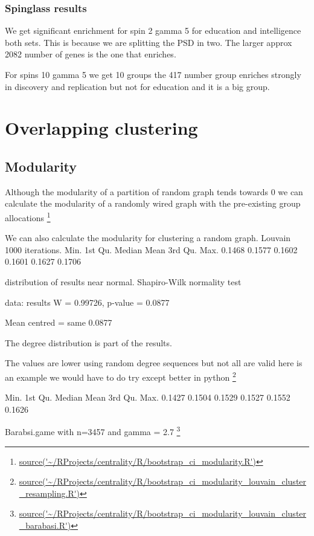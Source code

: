 \subsubsection{Spinglass results}
We get significant enrichment for spin 2 gamma 5 for education and intelligence both sets. This is because we are splitting the PSD in two. The larger approx 2082 number of genes is the one that enriches.

For spins 10 gamma 5 we get 10 groups the 417 number group enriches strongly in discovery and replication but not for education and it is a big group.


\section{Overlapping clustering}

\subsection{Modularity}

Although the modularity of a partition of random graph tends towards 0 we can calculate the modularity of a randomly wired graph with the pre-existing group allocations \footnote{\url{source('~/RProjects/centrality/R/bootstrap_ci_modularity.R')}}

We can also calculate the modularity for clustering a random graph. Louvain 1000 iterations.
  Min. 1st Qu.  Median    Mean 3rd Qu.    Max. 
 0.1468  0.1577  0.1602  0.1601  0.1627  0.1706 
 
 distribution of results near normal. 	Shapiro-Wilk normality test

data:  results
W = 0.99726, p-value = 0.0877

Mean centred = same 0.0877

The degree distribution is part of the results. 

The values are lower using random degree sequences but not all are valid here is an example we would have to do try except better in python \footnote{\url{source('~/RProjects/centrality/R/bootstrap_ci_modularity_louvain_cluster_resampling.R')}}

   Min. 1st Qu.  Median    Mean 3rd Qu.    Max. 
 0.1427  0.1504  0.1529  0.1527  0.1552  0.1626 
 
 Barabsi.game with n=3457 and gamma = 2.7
 \footnote{\url{source('~/RProjects/centrality/R/bootstrap_ci_modularity_louvain_cluster_barabasi.R')}}
 

